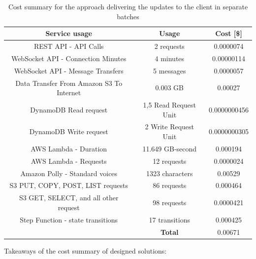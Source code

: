 \begin{table}[]
    \centering
    \begin{tabular}{ |c|c|c| } 
    \hline
    Service usage & Usage & Cost [\$] \\
    \hline
    REST API - API Calls & 2 requests & 0.0000074 \\
    WebSocket API - Connection Minutes & 4 minutes & 0.00000114 \\
    WebSocket API - Message Transfers & 5 messages & 0.0000057 \\
    \hline
    Data Transfer From Amazon S3 To Internet & 0.003 GB & 0.00027 \\
    \hline
    DynamoDB Read request & 1,5 Read Request Unit & 0.0000000456 \\
    DynamoDB Write request & 2 Write Request Unit & 0.0000000305 \\
    \hline
    AWS Lambda - Duration & 11.649 GB-second & 0.000194 \\
    AWS Lambda - Requests & 12 requests & 0.0000024 \\
    \hline
    Amazon Polly - Standard voices & 1323 characters & 0.00529 \\
    \hline
    S3 PUT, COPY, POST, LIST requests & 86 requests & 0.000464 \\
    S3 GET, SELECT, and all other request & 98 requests & 0.0000421 \\
    \hline
    Step Function - state transitions & 17 transitions & 0.000425 \\
    \hline
    \multicolumn{1}{c|}{} & \textbf{Total} & 0.00671 \\
    \cline{2-3}
    \end{tabular}
    \caption{Cost summary for the approach delivering the updates to the client in separate batches}
    \label{table:case-study-service-initial-batch-spending-summary}
\end{table}

Takeaways of the cost summary of designed solutions:

